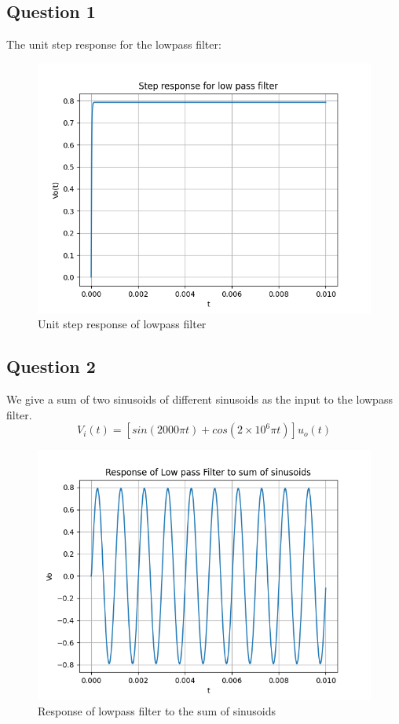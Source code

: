 \documentclass[11pt, a4paper]{article}
\begin{document}
\subsection*{Question 1}
The unit step response for the lowpass filter:


\begin{figure}[!tbh]
\centering
\includegraphics[scale=0.5]{assgn8_plot2.png} 
\caption{Unit step response of lowpass filter}
\label{fig2}
\end{figure}

\subsection*{Question 2}
We give a sum of two sinusoids of different sinusoids as the input to the lowpass filter.
\begin{equation*}
 V_i(t)=[sin(2000 \pi t) + cos(2×10^6 \pi t)]u_o(t)
\end{equation*}
 


\begin{figure}[!tbh]
\centering
\includegraphics[scale=0.5]{assgn8_plot3.png} 
\caption{Response of lowpass filter to the sum of sinusoids}
\label{fig3}
\end{figure}
\end{document}
